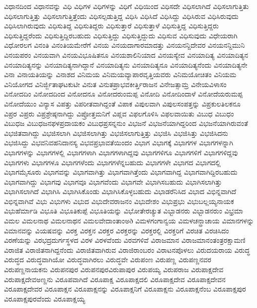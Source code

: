 {ವಿಧಾನದಿಂದ
ವಿಧಾನವನ್ನು
ವಿಧಿ
ವಿಧಿಗಳ
ವಿಧಿಗಳನ್ನು
ವಿಧಿಗೆ
ವಿಧಿಯಿಂದ
ವಿಧಿಸದೇ
ವಿಧಿಸಲಾಗಿದೆ
ವಿಧಿಸಲಾಗುತ್ತಿತು
ವಿಧಿಸಲಾಗುತ್ತಿತ್ತು
ವಿಧಿಸಲಾಗುತ್ತಿತ್ತೆಂದು
ವಿಧಿಸಲ್ಪಡುತ್ತಿದ್ದ
ವಿಧಿಸಿ
ವಿಧಿಸಿದೆ
ವಿಧಿಸಿದ್ದು
ವಿಧಿಸಿರುವ
ವಿಧಿಸಿರುವುದು
ವಿಧಿಸಿಲಾಗಿರುವುದು
ವಿಧಿಸುತಿದ್ದ
ವಿಧಿಸುತಿದ್ದರು
ವಿಧಿಸುತ್ತಾರೆ
ವಿಧಿಸುತ್ತಾಳೆ
ವಿಧಿಸುತ್ತಿದ್ದ
ವಿಧಿಸುತ್ತಿದ್ದರು
ವಿಧಿಸುತ್ತಿದ್ದರೆಂದು
ವಿಧಿಸುತ್ತಿದ್ದಿರಬಹುದು
ವಿಧಿಸುತ್ತಿದ್ದು
ವಿಧಿಸುತ್ತಿದ್ದುದು
ವಿಧಿಸುವ
ವಿಧಿಸುವುದು
ವಿಧೇಯರಾಗಿ
ವಿಧೋರಲಗ
ವಿನಂತಿ
ವಿನಂತಿಯಮೇರೆಗೆ
ವಿನಯ
ವಿನಯದಾಗಾರಮಾದತ್ತು
ವಿನಯನನ್ದಿದೇವರ
ವಿನಯನನ್ದಿಮುನಿ
ವಿನಯಪರಂ
ವಿನಯವಾಗಿ
ವಿನಯವಿಭೂಷಿತನೂ
ವಿನಯಶಾಲಿನಿಯಾದ
ವಿನಯಸ್ಯೇವ
ವಿನಯಾದಿತ್ಯ
ವಿನಯಾದಿತ್ಯನ
ವಿನಯಾದಿತ್ಯನನ್ನು
ವಿನಯಾದಿತ್ಯನಾಗಿದ್ದಾನೆ
ವಿನಯಾದಿತ್ಯನು
ವಿನಯಾದಿತ್ಯನೂ
ವಿನಯಾದಿತ್ಯನೆಂದು
ವಿನಯಾದಿತ್ಯನೇ
ವಿನಾ
ವಿನಾಯತಿಯನ್ನು
ವಿನಾಶದ
ವಿನಿಮಯ
ವಿನಿಮಯವ್ಯಾಪಾರವೃತ್ತಿಯವರು
ವಿನಿಮಯೋಚಿತಂ
ವಿನಿಯಮ
ವಿನಿಯೋಗದ
ವಿನಿರ್ಜ್ಜಿತಾಘಟಕುಟೀ
ವಿನುತ
ವಿನುತಪ್ರಾಭವಕೀರ್ತ್ತಿರಾಜನ
ವಿನೇಜತ್ಸಾಮ್ರ
ವಿನೇಯವಿಳಾಸಂ
ವಿನೋದದಿಂ
ವಿನೋದದಿಂದ
ವಿನೋದನೂ
ವಿನೋದರುಂಮಪ್ಪ
ವಿನೋದಿ
ವಿನೋದಿಂದಾಳೆ
ವಿನೋದೆಯರುಮಪ್ಪ
ವಿನೋದೆಯುಂ
ವಿನ್ಯಾಸ
ವಿಪತ್ತು
ವಿಪರೀತವಾಗಿದ್ದಂತೆ
ವಿಪಾಕ
ವಿಪುಲವಾಗಿ
ವಿಪುಲಸಂಪತ್ತನ್ನು
ವಿಪ್ರಕುಲತಿಲಕನೂ
ವಿಪ್ರರ
ವಿಪ್ರರು
ವಿಪ್ರಶ್ರೇಷ್ಠನಾಗಿದ್ದು
ವಿಪ್ರೋತ್ತಮನಿಗೆ
ವಿಪ್ಲವ
ವಿಫಲಗೊಳಿಸಿ
ವಿಫಲವಾಯಿತು
ವಿಬುಧ
ವಿಬುಧಂ
ವಿಬುಧಜ
ವಿಬುಧಜನಫಳಪ್ರದಾಯಕಂ
ವಿಬುಧಪ್ರಸನ್ನನುಂ
ವಿಭಜನೆ
ವಿಭಜನೆಯಾಗಿದ್ದರಿಂದ
ವಿಭಜನೆಯಾಗಿರುವಂತೆ
ವಿಭಜಿತವಾಗಿದ್ದು
ವಿಭಜಿಸಲಾಗಿ
ವಿಭಜಿಸಲಾಗಿತ್ತು
ವಿಭಜಿಸಲಾಗುತ್ತಿತ್ತು
ವಿಭಜಿಸಿ
ವಿಭಜಿಸಿತ್ತು
ವಿಭಜಿಸಿದನು
ವಿಭಜಿಸಿದ್ದು
ವಿಭವನಿವಹನಿದಾನಸ್ಯ
ವಿಭವಪ್ರಭಾವತೆಯಿಂದಂ
ವಿಭಾಗ
ವಿಭಾಗಕ್ಕೆ
ವಿಭಾಗಗಳ
ವಿಭಾಗಗಳನ್ನಾಗಿ
ವಿಭಾಗಗಳನ್ನು
ವಿಭಾಗಗಳಲ್ಲಿ
ವಿಭಾಗಗಳಾಗಿ
ವಿಭಾಗಗಳಾಗಿದ್ದವು
ವಿಭಾಗಗಳಿಗೂ
ವಿಭಾಗಗಳಿಗೆ
ವಿಭಾಗಗಳಿದ್ದವು
ವಿಭಾಗಗಳು
ವಿಭಾಗಗಳೂ
ವಿಭಾಗಗಳೆಂದು
ವಿಭಾಗಗಳೆನ್ನಬಹುದು
ವಿಭಾಗಗಳೇ
ವಿಭಾಗದ
ವಿಭಾಗದಲ್ಲಿ
ವಿಭಾಗಮೈಸೂರು
ವಿಭಾಗವನ್ನು
ವಿಭಾಗವಾಗಿತ್ತು
ವಿಭಾಗವಾಗಿತ್ತೆಂದು
ವಿಭಾಗವಾಗಿದ್ದ
ವಿಭಾಗವಾಗಿದ್ದಿರಬಹುದು
ವಿಭಾಗವಾಗಿದ್ದು
ವಿಭಾಗವು
ವಿಭಾಗವೂ
ವಿಭಾಗವೆಂದು
ವಿಭಾಗವೇ
ವಿಭಾಗಿಸಬಹುದು
ವಿಭಾಗಿಸಲಾಗಿತ್ತು
ವಿಭಾಗಿಸಲಾಗಿದೆ
ವಿಭಾಗಿಸಿ
ವಿಭಾಗಿಸಿಕೊಂಡು
ವಿಭಾಗಿಸಿಕೊಳ್ಳಬಹುದು
ವಿಭಾಡರೆನಿಸಿದ
ವಿಭಾದ
ವಿಭಿನ್ನವಾಗಿದೆ
ವಿಭಿನ್ನವಾಗಿವೆ
ವಿಭು
ವಿಭುಗಳು
ವಿಭುದ
ವಿಭುದೇವರಾಜನಂ
ವಿಭುದೇಶಂ
ವಿಭುಪ್ರಭು
ವಿಭುಬಲ್ಲಯ್ಯನಾಯಕ
ವಿಭುಹೆರ್ಮಾಡಿ
ವಿಭೂತಿ
ವಿಭೂತಿಕುಪ್ಪೆ
ವಿಭೂತಿಯನ್ನು
ವಿಭೋತೇರಚ್ಯುತ
ವಿಭ್ಬಾಡನರು
ವಿಭ್ಬಾಡನರುಂ
ವಿಭ್ರಮಾ
ವಿಮಲ
ವಿಮಲನಾಥ
ವಿಮಲನಾಥನ
ವಿಮಲವೇದಾಂತಾಂಅð
ವಿಮಳಗಂಗಾನ್ವಯ
ವಿಮಳಚನ್ದ್ರಾಚಾಯ
ವಿಮಾನಗಳನ್ನು
ವಿಮಾನವನ್ನು
ವಿಯಷವನ್ನು
ವಿರಕ್ತ
ವಿರಕ್ತನ
ವಿರಕ್ತರ
ವಿರಕ್ತರನ್ನು
ವಿರಕ್ತರಲ್ಲಿ
ವಿರಕ್ತರಿಗೆ
ವಿರಚಿತ
ವಿರಚಿಸಿದಂ
ವಿರಣೆಯನ್ನು
ವಿರಭದ್ರದುರ್ಗಸ್ಥಳದ
ವಿರಳ
ವಿರಳವೆಂದು
ವಿರವಗಳಿವೆ
ವಿರಾಜಮಾನ
ವಿರಾಜಮಾನಂತಂತ್ರರಕ್ಷಾಮಣಿ
ವಿರಾಜಿತ
ವಿರಾಜಿತನಾಗಿದ್ದನೆಂದು
ವಿರಾಜಿತವಾಗಿರುವ
ವಿರಾಜಿರಾಂಬರಂ
ವಿರಾಟನಪೊಳಲು
ವಿರುದಯರಾಯ
ವಿರುದ್ಧ
ವಿರುದ್ಧದ
ವಿರುದ್ಧವಾಗಿಯೋ
ವಿರುದ್ಧವಾಗಿರಲು
ವಿರುದ್ಧವೇ
ವಿರುಪಂಣ
ವಿರುಪಣ್ಣ
ವಿರುಪಣ್ಣನವರ
ವಿರುಪಣ್ಣನಾಯಕನು
ವಿರುಪನಪುರ
ವಿರುಪನಪುರವಿರುಪಾಪುರ
ವಿರುಪಯ್ಯ
ವಿರುಪರಾಜ
ವಿರುಪಾಕ್ಷದೇವ
ವಿರುಪಾಕ್ಷದೇವಅಣ್ಣನು
ವಿರೂಪವಾಗಿದೆ
ವಿರೂಪಾಕ್ಷ
ವಿರೂಪಾಕ್ಷದಲಿ
ವಿರೂಪಾಕ್ಷದೇವ
ವಿರೂಪಾಕ್ಷದೇವನ
ವಿರೂಪಾಕ್ಷದೇವರ
ವಿರೂಪಾಕ್ಷನ
ವಿರೂಪಾಕ್ಷನನ್ನು
ವಿರೂಪಾಕ್ಷನಿಗೆ
ವಿರೂಪಾಕ್ಷನು
ವಿರೂಪಾಕ್ಷನೆಂಬ
ವಿರೂಪಾಕ್ಷಪುರ
ವಿರೂಪಾಕ್ಷಪುರವೆಂದು
ವಿರೂಪಾಕ್ಷಯ್ಯ
}
